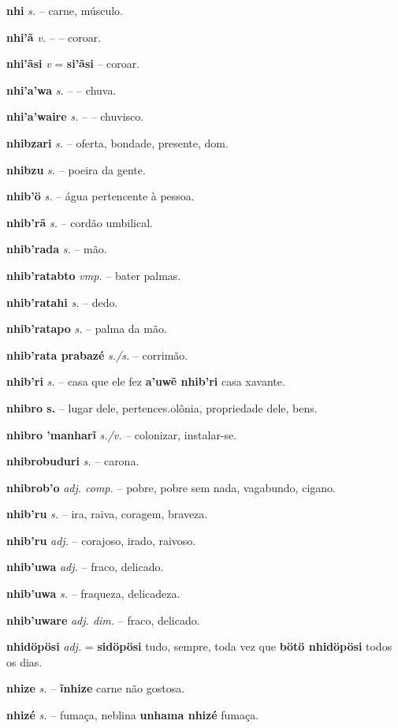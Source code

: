 \textbf{nhi} \textit{s.} -- carne, músculo.

\textbf{nhi'ã} \textit{v.} -- -- coroar.

\textbf{nhi'ãsi} \textit{v} = \textbf{si'ãsi} -- coroar.

\textbf{nhi'a'wa} \textit{s.} -- -- chuva.

\textbf{nhi'a'waire} \textit{s.} -- -- chuvisco.

\textbf{nhibzari} \textit{s.} -- oferta, bondade, presente, dom.

\textbf{nhibzu} \textit{s.} -- poeira da gente.

\textbf{nhib'ö} \textit{s.} -- água pertencente à pessoa.

\textbf{nhib'rã} \textit{s.} -- cordão umbilical.

\textbf{nhib'rada} \textit{s.} -- mão.

\textbf{nhib'ratabto} \textit{vmp.} -- bater palmas.

\textbf{nhib'ratahi} \textit{s.} -- dedo.

\textbf{nhib'ratapo} \textit{s.} -- palma da mão.

\textbf{nhib'rata prabazé} \textit{s./s.} -- corrimão.

\textbf{nhib'ri} \textit{s.} -- casa que ele fez  \textbf{a'uwẽ nhib'ri} casa xavante.

\textbf{nhibro s.} -- lugar dele, pertences.olônia, propriedade dele, bens.

\textbf{nhibro 'manharĩ} \textit{s./v.} -- colonizar, instalar-se.

\textbf{nhibrobuduri} \textit{s.} -- carona.

\textbf{nhibrob'o} \textit{adj. comp.} -- pobre, pobre sem nada, vagabundo, cigano.

\textbf{nhib'ru} \textit{s.} -- ira, raiva, coragem, braveza.

\textbf{nhib'ru} \textit{adj.} -- corajoso, irado, raivoso.

\textbf{nhib'uwa} \textit{adj.} -- fraco, delicado.

\textbf{nhib'uwa} \textit{s.} -- fraqueza, delicadeza.

\textbf{nhib'uware} \textit{adj. dim.} -- fraco, delicado.

\textbf{nhidöpösi} \textit{adj.} = \textbf{sidöpösi} tudo, sempre, toda vez que  \textbf{bötö nhidöpösi} todos os dias.

\textbf{nhize} \textit{s.} -- \textbf{ĩnhize} carne não gostosa.

\textbf{nhizé} \textit{s.} -- fumaça, neblina  \textbf{unhama nhizé} fumaça.


